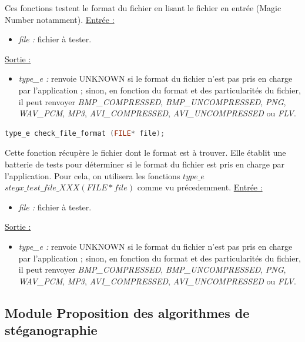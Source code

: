 \documentclass[11pt]{article}
\begin{document}
Ces fonctions testent le format du fichier en lisant le fichier en entrée 
(Magic Number notamment). 
\newline
\underline{Entrée :} 
\begin{itemize}
\item \textit{file :} fichier à tester. 
\end{itemize}
\underline{Sortie :} 
\begin{itemize}
\item \textit{type\_e :} renvoie UNKNOWN si le format du fichier n'est pas pris en 
charge par l'application ; sinon, en fonction du format et des particularités 
du fichier, il peut renvoyer \textit{BMP\_COMPRESSED}, \textit{BMP\_UNCOMPRESSED}, 
\textit{PNG}, \textit{WAV\_PCM}, \textit{MP3}, \textit{AVI\_COMPRESSED}, 
\textit{AVI\_UNCOMPRESSED} ou \textit{FLV}. 
\newline 
\end{itemize}

\begin{lstlisting}[language=c]
type_e check_file_format (FILE* file);
\end{lstlisting}

Cette fonction récupère le fichier dont le format est à trouver. Elle établit une 
batterie de tests pour déterminer si le format du fichier est pris en charge 
par l'application. 
Pour cela, on utilisera les fonctions 
$type\_e$ $stegx\_test\_file\_XXX (FILE* file)$ comme vu précedemment. 
\newline
\underline{Entrée :} 
\begin{itemize}
\item \textit{file :} fichier à tester. 
\end{itemize}
\underline{Sortie :} 
\begin{itemize}
\item \textit{type\_e :} renvoie UNKNOWN si le format du fichier n'est pas pris en 
charge par l'application ; sinon, en fonction du format et des particularités 
du fichier, il peut renvoyer \textit{BMP\_COMPRESSED}, \textit{BMP\_UNCOMPRESSED}, 
\textit{PNG}, \textit{WAV\_PCM}, \textit{MP3}, \textit{AVI\_COMPRESSED}, 
\textit{AVI\_UNCOMPRESSED} ou \textit{FLV}. 
\newline 
\end{itemize}

\subsection{Module Proposition des algorithmes 
de stéganographie}
\end{document}
